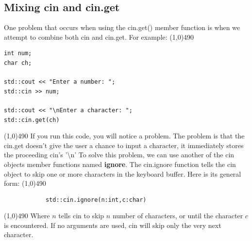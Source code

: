 \documentclass{report}
\begin{document}
    \bigbreak \noindent 
    \subsection{Mixing cin and cin.get}
    \bigbreak \noindent 
    One problem that occurs when using the cin.get() member function is when we attempt to combine both cin and cin.get. For example:
    \smallbreak \noindent
    \line(1,0){490}
    \begin{verbatim}
int num;
char ch;

std::cout << "Enter a number: ";
std::cin >> num;

std::cout << "\nEnter a character: ";
std::cin.get(ch)
    \end{verbatim}
    \line(1,0){490}
    \bigbreak \noindent 
    If you run this code, you will notice a problem. The problem is that the cin.get doesn't give the user a chance to input a character, it immediately stores the proceeding cin's '\textbackslash n'
    \bigbreak \noindent 
    To solve this problem, we can use another of the cin objects member functions named \textbf{ignore}. The cin.ignore function tells the cin object to skip one or more characters in the keyboard buffer. Here is its general form:
    \smallbreak \noindent
    \line(1,0){490}
    \begin{verbatim}
            std::cin.ignore(n:int,c:char)
    \end{verbatim}
    \line(1,0){490}
    \bigbreak \noindent 
    Where $n$ tells cin to skip $n$ number of characters, or until the character $c$ is encountered. If no arguments are used, cin will skip only the very next character.





    \pagebreak \bigbreak \noindent 
\end{document}
